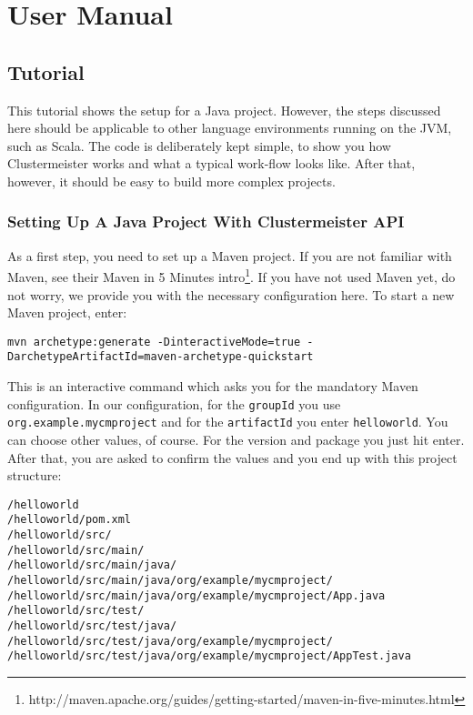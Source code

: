 \section{User Manual}

\subsection{Tutorial}

\label{tutorial}

This tutorial shows the setup for a Java project. However, the steps discussed here should be applicable to other language environments running on the JVM, such as Scala. The code is deliberately kept simple, to show you how Clustermeister works and what a typical work-flow looks like. After that, however, it should be easy to build more complex projects.

\subsubsection{Setting Up A Java Project With Clustermeister API}

As a first step, you need to set up a Maven project. If you are not familiar with Maven, see their Maven in 5 Minutes intro\footnote{http://maven.apache.org/guides/getting-started/maven-in-five-minutes.html}. 
If you have not used Maven yet, do not worry, we provide you with the necessary configuration here. To start a new Maven project, enter:

\begin{lstlisting}[breaklines=true, backgroundcolor=\color{lbcolor}]
 mvn archetype:generate -DinteractiveMode=true -DarchetypeArtifactId=maven-archetype-quickstart
\end{lstlisting}

This is an interactive command which asks you for the mandatory Maven configuration. In our configuration, for the \texttt{groupId} you use \texttt{org.example.mycmproject} and for the \texttt{artifactId} you enter \texttt{helloworld}. You can choose other values, of course. For the version and package you just hit enter. After that, you are asked to confirm the values and you end up with this project structure:

\begin{lstlisting}[breaklines=true, backgroundcolor=\color{lbcolor}]
/helloworld
/helloworld/pom.xml
/helloworld/src/
/helloworld/src/main/
/helloworld/src/main/java/
/helloworld/src/main/java/org/example/mycmproject/
/helloworld/src/main/java/org/example/mycmproject/App.java
/helloworld/src/test/
/helloworld/src/test/java/
/helloworld/src/test/java/org/example/mycmproject/
/helloworld/src/test/java/org/example/mycmproject/AppTest.java
\end{lstlisting}

